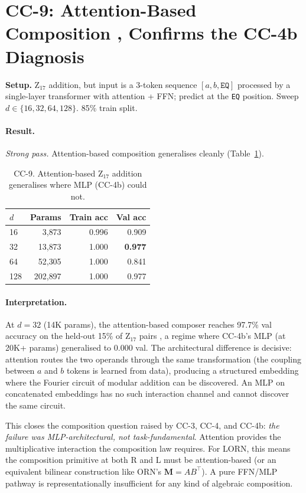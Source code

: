 \documentclass[10pt, twocolumn, a4paper]{article}
\newcommand{\M}{\mathbf{M}}
\begin{document}
\section{CC-9: Attention-Based Composition ,  Confirms the CC-4b Diagnosis}

\textbf{Setup.} Z$_{17}$ addition, but input is a 3-token sequence $[a, b, \texttt{EQ}]$ processed by a single-layer transformer with attention + FFN; predict at the \texttt{EQ} position. Sweep $d \in \{16, 32, 64, 128\}$. 85\% train split.

\paragraph{Result.} \emph{Strong pass.} Attention-based composition generalises cleanly (Table~\ref{tab:cc9}).

\begin{table}[t]
\centering\small
\caption{CC-9. Attention-based Z$_{17}$ addition generalises where MLP (CC-4b) could not.}
\label{tab:cc9}
\begin{tabular}{lrrr}
\toprule
$d$ & Params & Train acc & Val acc \\
\midrule
16  & 3{,}873   & 0.996 & 0.909 \\
32  & 13{,}873  & 1.000 & \textbf{0.977} \\
64  & 52{,}305  & 1.000 & 0.841 \\
128 & 202{,}897 & 1.000 & 0.977 \\
\bottomrule
\end{tabular}
\end{table}

\paragraph{Interpretation.} At $d=32$ (14K params), the attention-based composer reaches 97.7\% val accuracy on the held-out 15\% of Z$_{17}$ pairs ,  a regime where CC-4b's MLP (at 20K+ params) generalised to 0.000 val. The architectural difference is decisive: attention routes the two operands through the same transformation (the coupling between $a$ and $b$ tokens is learned from data), producing a structured embedding where the Fourier circuit of modular addition can be discovered. An MLP on concatenated embeddings has no such interaction channel and cannot discover the same circuit.

This closes the composition question raised by CC-3, CC-4, and CC-4b: \emph{the failure was MLP-architectural, not task-fundamental}. Attention provides the multiplicative interaction the composition law requires. For LORN, this means the composition primitive at both R and L must be attention-based (or an equivalent bilinear construction like ORN's $\M = AB^\top$). A pure FFN/MLP pathway is representationally insufficient for any kind of algebraic composition.
\end{document}
